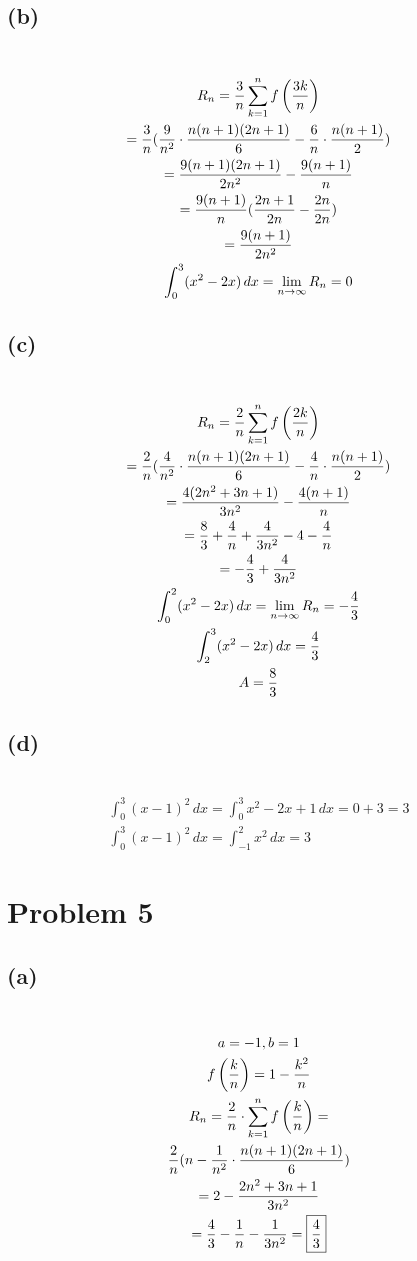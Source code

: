 \documentclass[12pt]{article}
\newcommand*{\paren}[1]{\ensuremath\left(#1\right)}
\newcommand{\problem}[1]{\section{Problem #1}}
\newcommand{\subproblem}[1]{\subsection{(#1)} \,}
\begin{document}
\subproblem{b}
\begin{gather*}
    R_n=\frac{3}{n} \sum_{k=1}^n f\paren{\frac{3k}{n}}\\
    =\frac{3}{n}(\frac{9}{n^2}\cdot \frac{n(n+1)(2n+1)}{6}-\frac{6}{n} \cdot \frac{n(n+1)}{2})\\
    =\frac{9(n+1)(2n+1)}{2n^2}-\frac{9(n+1)}{n}\\
    =\frac{9(n+1)}{n} (\frac{2n+1}{2n} - \frac{2n}{2n})\\
    =\frac{9(n+1)}{2n^2}\\
    \int_0^3 (x^2-2x) \, dx=\lim_{n \to \infty} R_n =0
\end{gather*}

\subproblem{c}
\begin{gather*}
    R_n=\frac{2}{n} \sum_{k=1}^n f\paren{\frac{2k}{n}}\\
    =\frac{2}{n}(\frac{4}{n^2}\cdot \frac{n(n+1)(2n+1)}{6}-\frac{4}{n} \cdot \frac{n(n+1)}{2})\\
    =\frac{4(2n^2+3n+1)}{3n^2} - \frac{4(n+1)}{n}\\
    =\frac{8}{3}+\frac{4}{n}+\frac{4}{3n^2}-4-\frac{4}{n}\\
    =-\frac{4}{3}+\frac{4}{3n^2}\\
    \int_0^2 (x^2-2x) \, dx = \lim_{n \to \infty} R_n =-\frac{4}{3}\\
    \int_2^3 (x^2-2x) \, dx = \frac{4}{3}\\
    A=\frac{8}{3}
\end{gather*}

\subproblem{d}
\begin{gather*}
    \int_0^3 (x-1)^2 \, dx = \int_0^3 x^2-2x+1 \, dx = 0+3=3\\
    \int_0^3 (x-1)^2 \, dx = \int_{-1}^2 x^2 \, dx =3
\end{gather*}


\problem{5}

\subproblem{a}
\begin{gather*}
    a=-1,b=1\\
    f\paren{\frac{k}{n}}=1-\frac{k^2}{n}\\
    R_n=\frac{2}{n}\cdot \sum_{k=1}^n f\paren{\frac{k}{n}}=\\
    \frac{2}{n}(n-\frac{1}{n^2} \cdot \frac{n(n+1)(2n+1)}{6})\\
    =2-\frac{2n^2+3n+1}{3n^2}\\
    =\frac{4}{3}-\frac{1}{n}-\frac{1}{3n^2}=\boxed{\frac{4}{3}}
\end{gather*}
\end{document}
